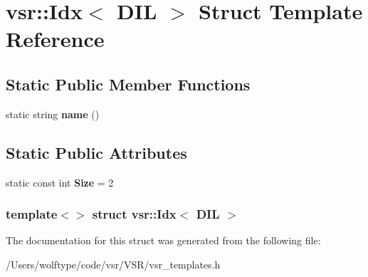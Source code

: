 \hypertarget{structvsr_1_1_idx_3_01_d_i_l_01_4}{\section{vsr\-:\-:Idx$<$ D\-I\-L $>$ Struct Template Reference}
\label{structvsr_1_1_idx_3_01_d_i_l_01_4}
}
\subsection*{Static Public Member Functions}
\begin{DoxyCompactItemize}
\item 
\hypertarget{structvsr_1_1_idx_3_01_d_i_l_01_4_af7340c3b353557d005be2278714986fa}{static string {\bfseries name} ()}\label{structvsr_1_1_idx_3_01_d_i_l_01_4_af7340c3b353557d005be2278714986fa}

\end{DoxyCompactItemize}
\subsection*{Static Public Attributes}
\begin{DoxyCompactItemize}
\item 
\hypertarget{structvsr_1_1_idx_3_01_d_i_l_01_4_aa495584400823622eb785ec448efc14b}{static const int {\bfseries Size} = 2}\label{structvsr_1_1_idx_3_01_d_i_l_01_4_aa495584400823622eb785ec448efc14b}

\end{DoxyCompactItemize}
\subsubsection*{template$<$$>$ struct vsr\-::\-Idx$<$ D\-I\-L $>$}



The documentation for this struct was generated from the following file\-:\begin{DoxyCompactItemize}
\item 
/\-Users/wolftype/code/vsr/\-V\-S\-R/vsr\-\_\-templates.\-h\end{DoxyCompactItemize}
